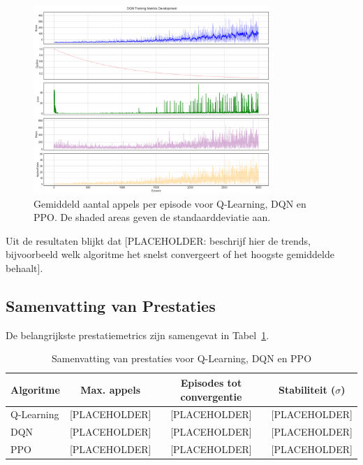 \documentclass[a4paper,10pt]{report}
\begin{document}
\begin{figure}[ht]
    \centering
    \includegraphics[width=0.8\textwidth]{../Experimenten/Snake/DQN/dqn_analysis.png}
    \caption{Gemiddeld aantal appels per episode voor Q-Learning, DQN en PPO. De shaded areas geven de standaarddeviatie aan.}
    \label{fig:score_episode}
\end{figure}

Uit de resultaten blijkt dat [PLACEHOLDER: beschrijf hier de trends,
        bijvoorbeeld welk algoritme het snelst convergeert of het hoogste gemiddelde
        behaalt].

\subsection{Samenvatting van Prestaties}
De belangrijkste prestatiemetrics zijn samengevat in Tabel~\ref{tab:prestatie}.

\begin{table}[ht]
    \centering
    \caption{Samenvatting van prestaties voor Q-Learning, DQN en PPO}
    \label{tab:prestatie}
    \begin{tabular}{|l|c|c|c|}
        \hline
        \textbf{Algoritme} & \textbf{Max. appels} & \textbf{Episodes tot convergentie} & \textbf{Stabiliteit ($\sigma$)} \\ \hline
        Q-Learning         & [PLACEHOLDER]        & [PLACEHOLDER]                      & [PLACEHOLDER]                   \\ \hline
        DQN                & [PLACEHOLDER]        & [PLACEHOLDER]                      & [PLACEHOLDER]                   \\ \hline
        PPO                & [PLACEHOLDER]        & [PLACEHOLDER]                      & [PLACEHOLDER]                   \\ \hline
    \end{tabular}
\end{table}
\end{document}
